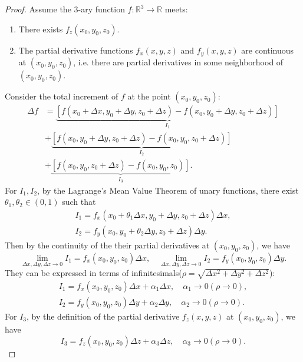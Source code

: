 \documentclass[11pt]{../../TexTemplate/elegantbook}
\begin{document}
\begin{proof}
    Assume the \(3\)-ary function \(f: \mathbb{R}^3 \to \mathbb{R}\) meets:
    \begin{enumerate}
        \item There exists \(f_{z}(x_{0},y_{0},z_{0})\). 
        \item The partial derivative functions \(f_{x}(x,y,z)\) and \(f_{y}(x,y,z)\) are continuous at \((x_{0},y_{0},z_{0})\),
            i.e. there are partial derivatives in some neighborhood of \((x_{0},y_{0},z_{0})\).
    \end{enumerate}
    Consider the total increment of \(f\) at the point \((x_{0},y_{0},z_{0})\):
    \begin{align*}
        \Delta f 
        &= \underbrace{\left[ f(x_0 + \Delta x, y_0 + \Delta y, z_0 + \Delta z) - f(x_0, y_0 + \Delta y, z_0 + \Delta z) \right]}_{I_1}\\
        &+ \underbrace{\left[ f(x_0, y_0 + \Delta y, z_0 + \Delta z) - f(x_0, y_0, z_0 + \Delta z) \right]}_{I_2}\\
        &+ \underbrace{\left[ f(x_0, y_0, z_0 + \Delta z) - f(x_0, y_0, z_0) \right]}_{I_3}.
    \end{align*}
    For \(I_{1}, I_{2}\), by the Lagrange's Mean Value Theorem of unary functions, 
    there exist \(\theta_{1}, \theta_{2} \in (0,1)\) such that
    \begin{gather*}
        I_{1}=f_{x}(x_{0}+\theta_{1}\Delta x,y_{0}+\Delta y,z_{0}+\Delta z)\Delta x,\\
        I_{2}=f_{y}(x_{0},y_{0}+\theta_{2}\Delta y,z_{0}+\Delta z)\Delta y.
    \end{gather*}
    Then by the continuity of the their partial derivatives at \((x_{0},y_{0},z_{0})\), we have
    \[
        \lim_{\Delta x, \Delta y, \Delta z \to 0} I_{1} = f_{x}(x_{0},y_{0},z_{0})\Delta x, \quad
        \lim_{\Delta x, \Delta y, \Delta z \to 0} I_{2} = f_{y}(x_{0},y_{0},z_{0})\Delta y.
    \]
    They can be expressed in terms of infinitesimals(\(\rho = \sqrt{\Delta x^2 + \Delta y^2 + \Delta z^2}\)):
    \begin{align*}
        I_{1}=f_{x}(x_{0},y_{0},z_{0})\Delta x + \alpha_{1}\Delta x, \quad \alpha_{1}\to 0(\rho\to 0),\\
        I_{2}=f_{y}(x_{0},y_{0},z_{0})\Delta y + \alpha_{2}\Delta y, \quad \alpha_{2}\to 0(\rho\to 0).
    \end{align*}
    For \(I_{3}\), by the definition of the partial derivative \(f_{z}(x,y,z)\) at \((x_{0},y_{0},z_{0})\), we have
    \[
        I_{3}=f_{z}(x_{0},y_{0},z_{0})\Delta z + \alpha_{3}\Delta z, \quad \alpha_{3}\to 0(\rho\to 0).
\]
\end{proof}
\end{document}
